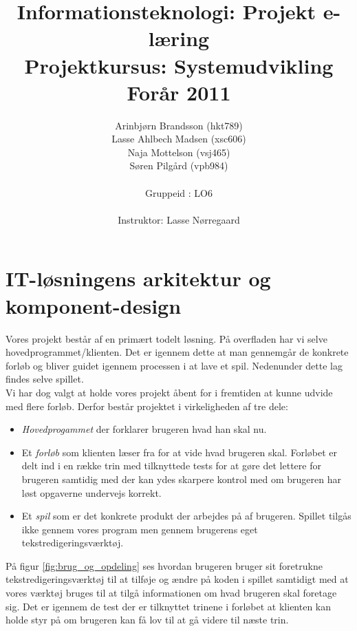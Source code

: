 \documentclass[10pt,a4paper,danish]{article}
\title{Informationsteknologi: Projekt e-læring \\ Projektkursus: Systemudvikling \\Forår 2011}
\author{Arinbjørn Brandsson (hkt789)\\Lasse Ahlbech Madsen (xsc606)\\Naja Mottelson (vsj465)\\Søren Pilgård (vpb984)\\
\\
Gruppeid : LO6\\
\\Instruktor: Lasse Nørregaard}
\begin{document}
\maketitle
\newpage

\tableofcontents
\newpage

\section{IT-løsningens arkitektur og komponent-design}
Vores projekt består af en primært todelt løsning.
På overfladen har vi selve hovedprogrammet/klienten. Det er igennem dette at man gennemgår de konkrete forløb og bliver guidet igennem processen i at lave et spil. Nedenunder dette lag findes selve spillet.
\\

Vi har dog valgt at holde vores projekt åbent for i fremtiden at kunne udvide med flere forløb. Derfor består projektet i virkeligheden af tre dele:
\begin{itemize}
\item \textit{Hovedprogammet} der forklarer brugeren hvad han skal nu.
\item Et \textit{forløb} som klienten læser fra for at vide hvad brugeren skal. Forløbet er delt ind i en række trin med tilknyttede tests for at gøre det lettere for brugeren samtidig med der kan ydes skarpere kontrol med om brugeren har løst opgaverne undervejs korrekt.
\item Et \textit{spil} som er det konkrete produkt der arbejdes på af brugeren.
Spillet tilgås ikke gennem vores program men gennem brugerens eget tekstredigeringsværktøj.
\end{itemize}
På figur \ref{fig:brug_og_opdeling} ses hvordan brugeren bruger sit foretrukne tekstredigeringsværktøj til at tilføje og ændre på koden i spillet samtidigt med at vores værktøj bruges til at tilgå informationen om hvad brugeren skal foretage sig. Det er igennem de test der er tilknyttet trinene i forløbet at klienten kan holde styr på om brugeren kan få lov til at gå videre til næste trin.
\end{document}
